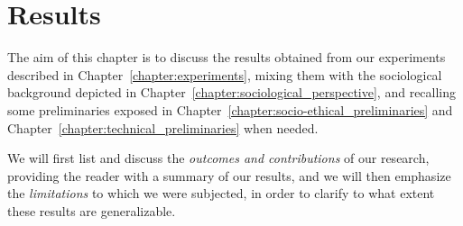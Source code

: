 \chapter{Results}
\label{chapter:results}
\thispagestyle{empty}

The aim of this chapter is to discuss the results obtained from our experiments described in Chapter~\ref{chapter:experiments}, mixing them with the sociological background depicted in Chapter~\ref{chapter:sociological_perspective}, and recalling some preliminaries exposed in Chapter~\ref{chapter:socio-ethical_preliminaries} and Chapter~\ref{chapter:technical_preliminaries} when needed.

We will first list and discuss the \textit{outcomes and contributions} of our research, providing the reader with a summary of our results, and we will then emphasize the \textit{limitations} to which we were subjected, in order to clarify to what extent these results are generalizable.


